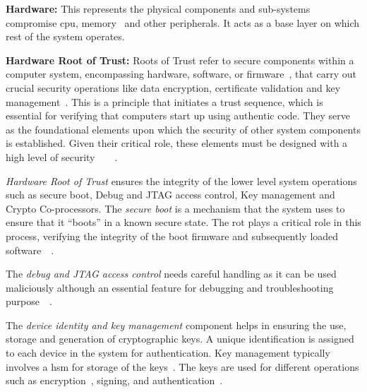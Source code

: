 

\textbf{Hardware:} This represents the physical components and sub-systems compromise
\gls{cpu}, memory~\cite{WhatisCo30:online} and other peripherals. It acts as a base layer on which
rest of the system operates.

\textbf{Hardware Root of Trust:} Roots of Trust refer to secure components within a computer system,
encompassing hardware, software, or firmware~\cite{WhatIsFi49:online}, that carry out crucial
security operations like data encryption, certificate validation and key management~\cite{Hardware83:online}.
This is a principle that initiates a trust sequence, which is essential for verifying that
computers start up using authentic code. They serve as the foundational elements upon which the
security of other system components is established. Given their critical role, these elements must
be designed with a high level of
security~\cite{WhatisRo39:online}~\cite{Introduc7:online}~\cite{RootofTr86:online}~\cite{Hardware83:online}.

\textit{Hardware Root of Trust} ensures the integrity of the lower level system operations such as
secure boot\cite{zimmer2016establishing}, Debug and JTAG access control, Key management and Crypto Co-processors.
The \textit{secure boot} is a mechanism that the system uses to ensure that it ``boots'' in a known secure state.
The \acrshort{rot} plays a critical role in this process, verifying the integrity of the boot firmware and
subsequently loaded software~\cite{Hardware83:online}~\cite{zimmer2016establishing}.

The \textit{debug and JTAG access control} needs careful handling as it can be used maliciously although
an essential feature for debugging and troubleshooting purpose~\cite{WhatisJT98:online}~\cite{JTAGhard62:online}.

The \textit{device identity and key management} component helps in ensuring the use, storage
and generation of cryptographic keys. A unique identification is assigned to each device
in the system for authentication. Key management typically involves a \gls{hsm} for storage
of the keys~\cite{WhatisKe81:online}. The keys are used for different operations such
as encryption~\cite{WhatisEn13:online}, signing, and authentication~\cite{needham1978using}.

